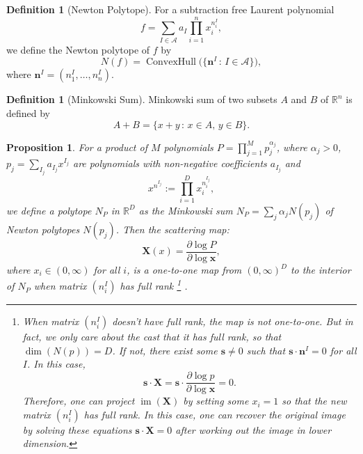 \documentclass[12pt]{article}
\theoremstyle{definition}
\newtheorem{defi}[para]{Definition}
\theoremstyle{plain}
\newtheorem{pro}[para]{Proposition}
\begin{document}
\begin{defi}[Newton Polytope]
For a subtraction free Laurent polynomial 
\[
	f = \sum_{I\in \mathscr A} a_I \prod_{i=1}^n x_i^{n^I_i},
\]
we define the Newton polytope of $f$ by
\[
	N(f)=\operatorname{ConvexHull}\bigl(\{\mathbf n^I\,:\, I\in \mathscr A\}\bigr),
\]
where $\mathbf n^I=(n^I_1,\dots,n^I_n)$. 
\end{defi}

\begin{defi}[Minkowski Sum]
Minkowski sum of two subsets $A$ and $B$ of $\mathbb R^n$ is defined by 
\[
	A+B=\{x+y\,:\,x\in A,\, y\in B\}.
\] 
\end{defi}

\begin{pro}
For a product of $M$ polynomials $P=\prod_{j=1}^M p_j^{\alpha_j}$, 
where $\alpha_j>0$, 
$p_j=\sum_{I_j} a_{I_j} x^{I_j}$ are polynomials with non-negative coefficients $a_{I_j}$ and
\[
	x^{n^{I_j}}:=\prod_{i=1}^D x_i^{n^{I_j}_i},
\]
we define a polytope $N_P$ in $\mathbb R^D$ as the Minkowski sum $N_P=\sum_j \alpha_j N(p_j)$
of Newton polytopes $N(p_j)$.
Then the scattering map:
\[
	\mathbf X(x)=\frac{\partial \log P}{\partial \log \mathbf x},
\]
where $x_i\in (0,\infty)$ for all $i$, is a one-to-one map from $(0,\infty)^D$ to the interior of $N_P$ when matrix $(n_i^I)$ has full rank%
\footnote{When matrix $(n_i^I)$ doesn't have full rank, the map is not one-to-one. 
	But in fact, we only care about the cast that it has full rank, so that $\dim (N(p))=D$. 
	If not, there exist some $\mathbf s\neq 0$ such that $\mathbf s \cdot \mathbf n^I=0$ for all $I$. 
	In this case,
	\[
	\mathbf s\cdot\mathbf X=\mathbf s\cdot\frac{\partial \log p}{\partial \log \mathbf x}=0.
	\]
	Therefore, one can project $\operatorname{im}(\mathbf X)$ 
	by setting some $x_i=1$ so that the new matrix $(n^I_i)$ has full rank.	
	In this case, one can recover the original image by solving these equations $\mathbf s\cdot\mathbf X=0$
	after working out the image in lower dimension.
	}%
	. 
\end{pro}
\end{document}
